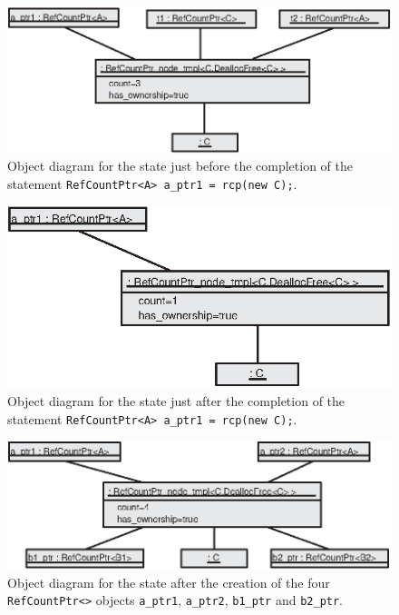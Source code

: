 {\bsinglespace
\begin{figure}
\begin{center}
\includegraphics*[bb= 0.0in 0.0in 4.4in 1.8in,scale=1.0
]{RefCountPtrObjectDiagram0}
\end{center}
{}\caption{ {}\label{rcp:fig:rcp-object-diagram_0} Object diagram for
the state just before the completion of the statement
{}\texttt{RefCountPtr<A> a\_ptr1 = rcp(new C);}. }
\end{figure}
\esinglespace}

{\bsinglespace
\begin{figure}
\begin{center}
\includegraphics*[bb= 0.0in 0.0in 4.4in 1.8in,scale=1.0
]{RefCountPtrObjectDiagram1}
\end{center}
{}\caption{ {}\label{rcp:fig:rcp-object-diagram_1} Object diagram for
the state just after the completion of the statement
{}\texttt{RefCountPtr<A> a\_ptr1 = rcp(new C);}.  }
\end{figure}
\esinglespace}

{\bsinglespace
\begin{figure}
\begin{center}
\includegraphics*[bb= 0.0in 0.0in 4.8in 1.8in,scale=1.0
]{RefCountPtrObjectDiagram4}
\end{center}
{}\caption{ {}\label{rcp:fig:rcp-object-diagram_4} Object diagram for
the state after the creation of the four {}\texttt{Ref\-Count\-Ptr<>}
objects {}\texttt{a\_ptr1}, {}\texttt{a\_ptr2}, {}\texttt{b1\_ptr} and
{}\texttt{b2\_ptr}.  }
\end{figure}
\esinglespace}

